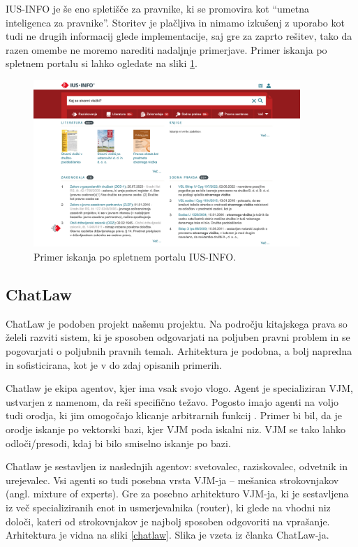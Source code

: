\documentclass[a4paper,12pt,openright]{book}
\begin{document}
IUS-INFO \cite{ius-info} je še eno spletišče za pravnike, ki se promovira kot “umetna inteligenca za pravnike”. Storitev je plačljiva in nimamo izkušenj z uporabo kot tudi ne drugih informacij glede implementacije, saj gre za zaprto rešitev, tako da razen omembe ne moremo narediti nadaljnje primerjave. Primer iskanja po spletnem portalu si lahko ogledate na sliki \ref{ius_info}.

\begin{figure}[htbp]
	\centering
	\includegraphics[width=0.9\textwidth]{ius-info.png}
	\caption{Primer iskanja po spletnem portalu IUS-INFO.}
	\label{ius_info}
\end{figure}

\clearpage

\subsection{ChatLaw}

ChatLaw \cite{chatlaw} je podoben projekt našemu projektu. Na področju kitajskega prava so želeli razviti sistem, ki je sposoben odgovarjati na poljuben pravni problem in se pogovarjati o poljubnih pravnih temah. Arhitektura je podobna, a bolj napredna in sofisticirana, kot je v do zdaj opisanih primerih.

Chatlaw je ekipa agentov, kjer ima vsak svojo vlogo. Agent je specializiran VJM, ustvarjen z namenom, da reši specifično težavo. Pogosto imajo agenti na voljo tudi orodja, ki jim omogočajo klicanje arbitrarnih funkcij \cite{agents}. Primer bi bil, da je orodje iskanje po vektorski bazi, kjer VJM poda iskalni niz. VJM se tako lahko odloči/presodi, kdaj bi bilo smiselno iskanje po bazi.

Chatlaw je sestavljen iz naslednjih agentov: svetovalec, raziskovalec, odvetnik in urejevalec. Vsi agenti so tudi posebna vrsta VJM-ja – mešanica strokovnjakov (angl. mixture of experts). Gre za posebno arhitekturo VJM-ja, ki je sestavljena iz več specializiranih enot in usmerjevalnika (router), ki glede na vhodni niz določi, kateri od strokovnjakov je najbolj sposoben odgovoriti na vprašanje. Arhitektura je vidna na sliki \ref{chatlaw}. Slika je vzeta iz članka ChatLaw-ja.
\end{document}

